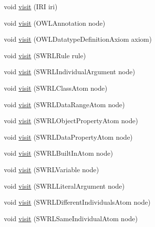 \begin{DoxyCompactItemize}
\item 
void \hyperlink{classorg_1_1coode_1_1owlapi_1_1functionalrenderer_1_1_o_w_l_object_renderer_aeb638479b36e031e3a120fb0bc417592}{visit} (I\-R\-I iri)
\item 
void \hyperlink{classorg_1_1coode_1_1owlapi_1_1functionalrenderer_1_1_o_w_l_object_renderer_a8765ca1eac8ae5c93de32f741d43275f}{visit} (O\-W\-L\-Annotation node)
\item 
void \hyperlink{classorg_1_1coode_1_1owlapi_1_1functionalrenderer_1_1_o_w_l_object_renderer_a668b6c421ea3466aa9185296ce305e90}{visit} (O\-W\-L\-Datatype\-Definition\-Axiom axiom)
\item 
void \hyperlink{classorg_1_1coode_1_1owlapi_1_1functionalrenderer_1_1_o_w_l_object_renderer_a67953eb288415fecbe2740ca7a3e7477}{visit} (S\-W\-R\-L\-Rule rule)
\item 
void \hyperlink{classorg_1_1coode_1_1owlapi_1_1functionalrenderer_1_1_o_w_l_object_renderer_a1f9c9955a175ecda90d7253f32c70fca}{visit} (S\-W\-R\-L\-Individual\-Argument node)
\item 
void \hyperlink{classorg_1_1coode_1_1owlapi_1_1functionalrenderer_1_1_o_w_l_object_renderer_a04d8d5e610411577ed5bb069bdbb64da}{visit} (S\-W\-R\-L\-Class\-Atom node)
\item 
void \hyperlink{classorg_1_1coode_1_1owlapi_1_1functionalrenderer_1_1_o_w_l_object_renderer_abc6549e57a541510ef605837ff0fd1cf}{visit} (S\-W\-R\-L\-Data\-Range\-Atom node)
\item 
void \hyperlink{classorg_1_1coode_1_1owlapi_1_1functionalrenderer_1_1_o_w_l_object_renderer_a4d27dde4cb798c02d8650ee0bf21f9a5}{visit} (S\-W\-R\-L\-Object\-Property\-Atom node)
\item 
void \hyperlink{classorg_1_1coode_1_1owlapi_1_1functionalrenderer_1_1_o_w_l_object_renderer_a1b94f7bec33cc275a12cc3dcf85d5dd8}{visit} (S\-W\-R\-L\-Data\-Property\-Atom node)
\item 
void \hyperlink{classorg_1_1coode_1_1owlapi_1_1functionalrenderer_1_1_o_w_l_object_renderer_a833b641d64f96bfc0d4ac7d15fefc035}{visit} (S\-W\-R\-L\-Built\-In\-Atom node)
\item 
void \hyperlink{classorg_1_1coode_1_1owlapi_1_1functionalrenderer_1_1_o_w_l_object_renderer_a518b2232192bfcff79cbf331cc3a142a}{visit} (S\-W\-R\-L\-Variable node)
\item 
void \hyperlink{classorg_1_1coode_1_1owlapi_1_1functionalrenderer_1_1_o_w_l_object_renderer_a2afad3980c89fa6b01c864e4fe227b1b}{visit} (S\-W\-R\-L\-Literal\-Argument node)
\item 
void \hyperlink{classorg_1_1coode_1_1owlapi_1_1functionalrenderer_1_1_o_w_l_object_renderer_a2d76ca22915789da6c10b882af7a5858}{visit} (S\-W\-R\-L\-Different\-Individuals\-Atom node)
\item 
void \hyperlink{classorg_1_1coode_1_1owlapi_1_1functionalrenderer_1_1_o_w_l_object_renderer_a4e1570c69875c480590a455b7c9de7eb}{visit} (S\-W\-R\-L\-Same\-Individual\-Atom node)
\end{DoxyCompactItemize}
